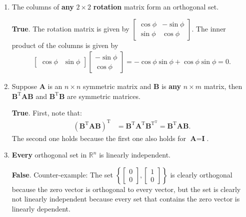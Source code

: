 \documentclass{exam}
\begin{document}
\begin{enumerate}
    \item The columns of \textbf{any} $2 \times 2$ \textbf{rotation} matrix form an orthogonal set.
	
	\begin{solutionorbox}[3.2in] \textbf{True}.
		The rotation matrix is given by $\begin{bmatrix} \cos \phi & -\sin \phi \\ \sin \phi & \cos \phi \end{bmatrix}$. The inner product of the columns is given by
		\begin{align*}
			\begin{bmatrix}
				\cos \phi & \sin \phi 
			\end{bmatrix}
			\begin{bmatrix}
				-\sin \phi \\
				\cos \phi
			\end{bmatrix}
			= -\cos \phi \sin \phi + \cos \phi \sin \phi = 0.
		\end{align*}
		
	\end{solutionorbox}

    \item Suppose $\textbf{A}$ is an $n \times n$ symmetric matrix and $\textbf{B}$ is \textbf{any} $n \times m$ matrix, then $\textbf{B}^\text{T}\textbf{A}\textbf{B}$ and $\textbf{B}^\text{T}\textbf{B}$ are symmetric matrices.
	
	\begin{solutionorbox}[3.2in] \textbf{True}.
		First, note that:
		\begin{align*}
			(\textbf{B}^\text{T}\textbf{A}\textbf{B})^\text{T} &= \textbf{B}^\text{T}\textbf{A}^\text{T}\textbf{B}^\text{T$^\text{T}$} = \textbf{B}^\text{T}\textbf{A}\textbf{B}.
		\end{align*}	
		The second one holds because the first one also holds for $\textbf{A} = \textbf{I}$.
	\end{solutionorbox}

    \item \textbf{Every} orthogonal set in $\mathbb{R}^n$ is linearly independent.

	\begin{solutionorbox}[2.2in] \textbf{False}.
		Counter-example: The set $\left\{ \begin{bmatrix} 0 \\ 0 \end{bmatrix}, \begin{bmatrix} 1 \\ 0 \end{bmatrix} \right\}$ is clearly orthogonal because the zero vector is orthogonal to every vector, but the set is clearly not linearly independent because every set that contains the zero vector is linearly dependent.
	\end{solutionorbox}

\end{enumerate}
\end{document}
